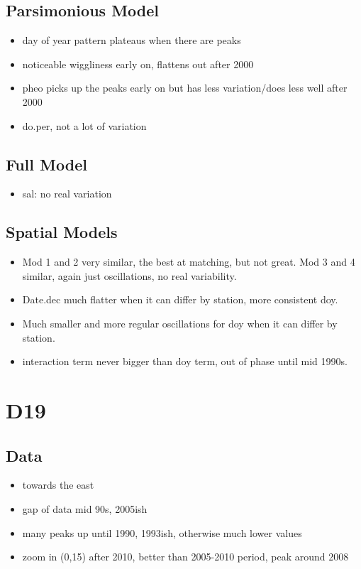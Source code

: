 \documentclass[12pt]{amsart}
\begin{document}
\subsection{Parsimonious Model}
\begin{itemize}
\item day of year pattern plateaus when there are peaks
\item noticeable wiggliness early on, flattens out after 2000
\item pheo picks up the peaks early on but has less variation/does less well after 2000
\item do.per, not a lot of variation
\end{itemize}
\subsection{Full Model}
\begin{itemize}
\item sal: no real variation
\end{itemize}

\subsection{Spatial Models}

\begin{itemize}
\item Mod 1 and 2 very similar, the best at matching, but not great. Mod 3 and 4 similar, again just oscillations, no real variability. 
\item Date.dec much flatter when it can differ by station, more consistent doy.
\item Much smaller and more regular oscillations for doy when it can differ by station.
\item interaction term never bigger than doy term, out of phase until mid 1990s.
\end{itemize}


\section{D19}
\subsection{Data}
\begin{itemize}
\item towards the east
\item gap of data mid 90s, 2005ish
\item many peaks up until 1990, 1993ish, otherwise much lower values
\item zoom in (0,15) after 2010, better than 2005-2010 period, peak around 2008
\end{itemize}
\end{document}

